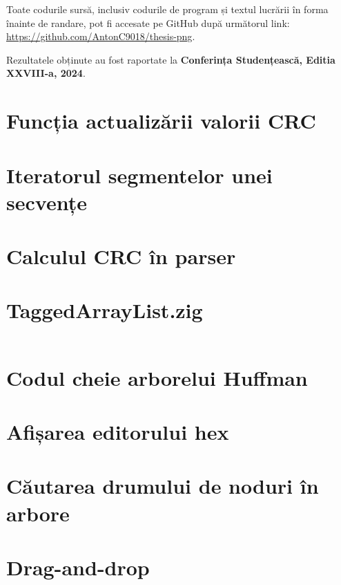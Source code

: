 \documentclass[a4paper,12pt]{report}
\renewcommand{\year}{2024}
\newcommand{\conferencesList}{Conferința Studențească, Editia XXVIII-a, \year}
\newcommand{\github}{\url{https://github.com/AntonC9018/thesis-png}}
\begin{document}
Toate codurile sursă, inclusiv codurile de program și textul lucrării
în forma înainte de randare, pot fi accesate pe GitHub după următorul link: \github.

Rezultatele obținute au fost raportate la \textbf{\conferencesList}\cite{self}.

\bibliographyChapter

\appendixChapter

\section{Funcția actualizării valorii CRC}\label{appendix:crc}

\section{Iteratorul segmentelor unei secvențe}\label{appendix:sequence_iterator}

\section{Calculul CRC în parser}\label{appendix:crc_sequence_defer_example}

\section{TaggedArrayList.zig}\label{appendix:main__TaggedArrayList}
\inputminted{zig}{../src/TaggedArrayList.zig}

\section{Codul cheie arborelui Huffman}\label{appendix:huffman_tree}

\section{Afișarea editorului hex}\label{appendix:draw_hex_grid}

\section{Căutarea drumului de noduri în arbore}\label{appendix:node_path_search_impl}

\section{Drag-and-drop}\label{appendix:drag_and_drop}

\declarationPage{}
\end{document}
